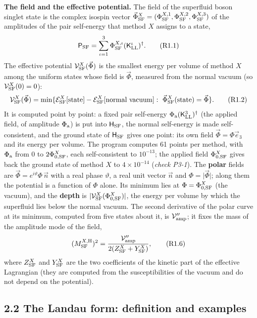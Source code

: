 \documentclass[
  10pt,
]{article}
\begin{document}
\textbf{The field and the effective potential.} The field of the
superfluid boson singlet state is the complex isospin vector
\(\vec\Phi^X_{\rm SF}=(\Phi^{X,1}_{\rm SF},\Phi^{X,2}_{\rm SF},\Phi^{X,3}_{\rm SF})\)
of the amplitudes of the pair self-energy that method \(X\) assigns to a
state,
\[\mathsf P_{\rm SF}=\sum_{\iota=1}^3\Phi^{X,\iota}_{\rm SF}(\mathsf K^\iota_{\rm LL})^\dagger.\tag{R1.1}\]
The effective potential \(\mathcal V^X_{\rm SF}(\vec\Phi)\) is the
smallest energy per volume of method \(X\) among the uniform states
whose field is \(\vec\Phi\), measured from the normal vacuum (so
\(\mathcal V^X_{\rm SF}(0)=0\)):
\[\mathcal V^X_{\rm SF}(\vec\Phi)=\min\{\mathcal E^X_{\rm SF}[\text{state}]-\mathcal E^X_{\rm SF}[\text{normal vacuum}]:\ \vec\Phi^X_{\rm SF}(\text{state})=\vec\Phi\}.\tag{R1.2}\]
It is computed point by point: a fixed pair self-energy
\(\Phi_{\rm a}(\mathsf K^3_{\rm LL})^\dagger\) (the applied field, of
amplitude \(\Phi_{\rm a}\)) is put into \(\mathsf H_{\rm SF}\), the
normal self-energy is made self-consistent, and the ground state of
\(\mathsf H_{\rm SF}\) gives one point: its own field
\(\vec\Phi=\Phi\vec e_3\) and its energy per volume. The program
computes 61 points per method, with \(\Phi_{\rm a}\) from \(0\) to
\(2\Phi^X_{0,{\rm SF}}\), each self-consistent to \(10^{-13}\); the
applied field \(\Phi^X_{0,{\rm SF}}\) gives back the ground state of
method \(X\) to \(4\times10^{-14}\) (\emph{check P3-1}). The
\textbf{polar} fields are \(\vec\Phi=e^{i\vartheta}\Phi\,\vec n\) with a
real phase \(\vartheta\), a real unit vector \(\vec n\) and
\(\Phi=\lvert\vec\Phi\rvert\); along them the potential is a function of
\(\Phi\) alone. Its minimum lies at \(\Phi=\Phi^X_{0,{\rm SF}}\) (the
vacuum), and the \textbf{depth} is
\(\lvert\mathcal V^X_{\rm SF}(\Phi^X_{0,{\rm SF}})\rvert\), the energy
per volume by which the superfluid lies below the normal vacuum. The
second derivative of the polar curve at its minimum, computed from five
states about it, is \(\mathcal V''_{\rm amp}\); it fixes the mass of the
amplitude mode of the field,
\[(M^{X,{\rm H}}_{\rm SF})^2=\frac{\mathcal V''_{\rm amp}}{2(Z^X_{\rm SF}+Y^X_{\rm SF})},\tag{R1.6}\]
where \(Z^X_{\rm SF}\) and \(Y^X_{\rm SF}\) are the two coefficients of
the kinetic part of the effective Lagrangian (they are computed from the
susceptibilities of the vacuum and do not depend on the potential).

\hypertarget{the-landau-form-definition-and-examples}{%
\subsection{2.2 The Landau form: definition and
examples}\label{the-landau-form-definition-and-examples}}
\end{document}
